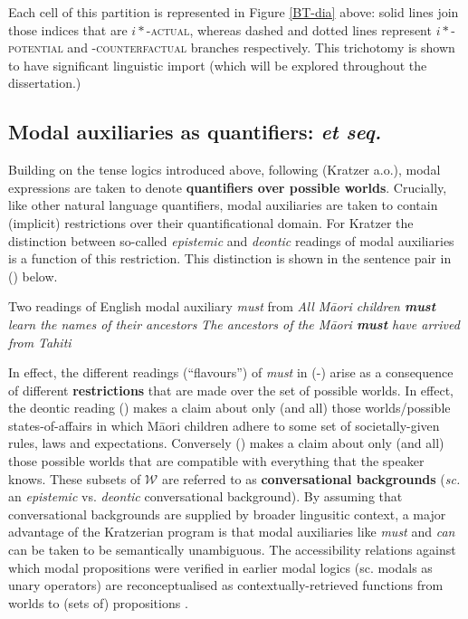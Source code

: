 \documentclass[12pt,dvipsnames]{report}
\begin{document}
\xe

 Each cell of this partition is represented in Figure \ref{BT-dia} above: solid lines join those indices that are \textsc{$ i* $-actual}, whereas dashed and dotted lines represent \textsc{$ i* $-potential} and \textsc{-counterfactual} branches respectively. This trichotomy is shown to have significant linguistic import (which will be explored throughout the dissertation.)

\subsection{Modal auxiliaries as quantifiers: \citealt{Kratzer1977} \textit{et seq.}}
 Building on the tense logics introduced above, following (Kratzer \citeyear{Kratzer1977,Kratzer1981,Kratzer1991} a.o.), modal expressions are taken to denote \textbf{quantifiers over possible worlds}. Crucially, like other natural language quantifiers, modal auxiliaries are taken to contain (implicit) restrictions over their quantificational domain. For Kratzer the distinction between so-called \textit{epistemic} and \textit{deontic} readings of modal auxiliaries is a function of this restriction. This distinction is shown in the sentence pair in () below.

\pex Two readings of English modal auxiliary \textit{must} from \citet[338]{Kratzer1977}
\a\textit{All Māori children \textbf{must} learn the names of their ancestors}
\a\textit{The ancestors of the Māori \textbf{must} have arrived from Tahiti}
\xe

In effect, the different readings (``flavours'') of \textit{must} in (-) arise as a consequence of different \textbf{restrictions} that are made over the set of possible worlds. In effect, the deontic reading () makes a claim about only (and all) those worlds/possible states-of-affairs in which Māori children adhere to some set of societally-given rules, laws and expectations. Conversely () makes a claim about only (and all) those possible worlds that are compatible with everything that the speaker knows. These subsets of $ \mathcal W$ are referred to as \textbf{conversational backgrounds} (\textit{sc.} an \textit{epistemic} vs. \textit{deontic} conversational background). By assuming that conversational backgrounds are supplied by broader lingusitic context, a major advantage of the Kratzerian program is that modal auxiliaries like \textit{must} and \textit{can} can be taken to be semantically unambiguous. The accessibility relations against which modal propositions were verified in earlier modal logics (sc. modals as unary operators) are reconceptualised as contextually-retrieved functions from worlds to (sets of) propositions \citep*[see][]{Kaufmann2006}. 
\end{document}
